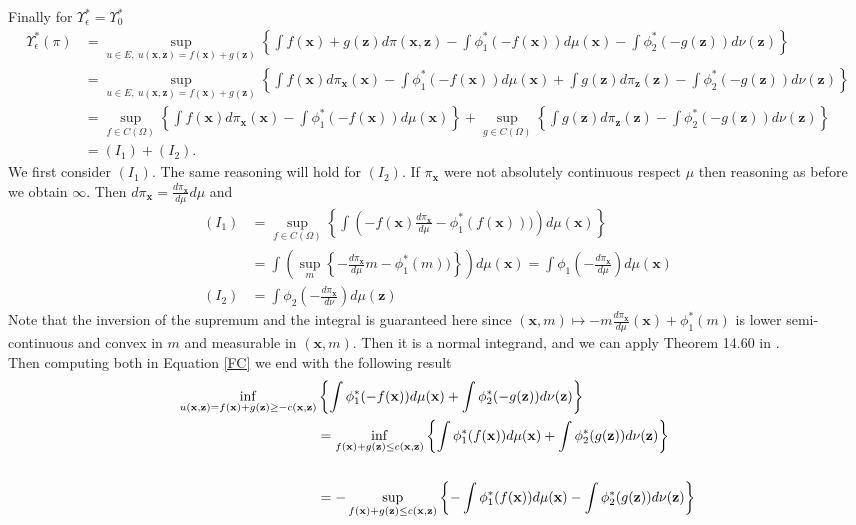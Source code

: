 Finally for $\Upsilon^*_{\epsilon}=\Upsilon^*_{0}$
\begin{align*}
\Upsilon^*_{\epsilon}(\pi)&=\sup_{u\in E,\  u(\textbf{x},{{\textbf{z}}})=f(\textbf{x})+g({{\textbf{z}}}) }\left\lbrace \int f(\textbf{x})+g({{\textbf{z}}}) d\pi(\textbf{x},{{\textbf{z}}})-\int \phi_1^*(-f(\textbf{x}))d\mu(\textbf{x}) -\int \phi_2^*(-g({{\textbf{z}}})) d\nu({{\textbf{z}}})\right\rbrace\\
 &=\sup_{u\in E,\  u(\textbf{x},{{\textbf{z}}})=f(\textbf{x})+g({{\textbf{z}}}) }\left\lbrace \int f(\textbf{x})d\pi_\textbf{x}(\textbf{x})-\int \phi_1^*(-f(\textbf{x}))d\mu(\textbf{x}) +\int g({{\textbf{z}}}) d\pi_{{\textbf{z}}}({{\textbf{z}}})-\int \phi_2^*(-g({{\textbf{z}}})) d\nu({{\textbf{z}}})\right\rbrace\\
  &=\sup_{f \in C(\Omega)}\left\lbrace \int f(\textbf{x})d\pi_\textbf{x}(\textbf{x})-\int \phi_1^*(-f(\textbf{x}))d\mu(\textbf{x})\right\rbrace +\sup_{g\in C(\Omega) }\left\lbrace \int g({{\textbf{z}}}) d\pi_{{\textbf{z}}}({{\textbf{z}}})-\int \phi_2^*(-g({{\textbf{z}}})) d\nu({{\textbf{z}}})\right\rbrace\\
  &=(I_1)+(I_2).
\end{align*}
We first consider  $(I_1)$. The same reasoning will hold for $(I_2)$. If $\pi_\textbf{x}$ were not absolutely continuous respect $\mu$ then reasoning as before we obtain $\infty$. Then $d \pi_\textbf{x}=\frac{d\pi_\textbf{x}}{d\mu}d\mu$ and
\begin{align*}
(I_1)&=\sup_{f \in C(\Omega)}\left\lbrace \int \left( -f(\textbf{x})\frac{d\pi_\textbf{x}}{d\mu}-\phi_1^*(f(\textbf{x})))\right)d\mu(\textbf{x})\right\rbrace\\
&=\int \left( \sup_{m}\left\lbrace -\frac{d\pi_\textbf{x}}{d\mu}m- \phi_1^*(m))\right\rbrace\right)d\mu(\textbf{x})=\int \phi_1(-\frac{d\pi_\textbf{x}}{d\mu})d\mu(\textbf{x})\\
(I_2)&=\int \phi_2(-\frac{d\pi_\textbf{x}}{d\nu})d\mu({{\textbf{z}}})
\end{align*}
Note that the inversion of the  supremum and  the integral  is guaranteed here since $(\textbf{x},m)\mapsto -m\frac{d\pi_\textbf{x}}{d\mu}(\textbf{x})+\phi_1^*(m)$ is lower semi-continuous and convex in $m$ and measurable in $(\textbf{x},m)$. Then it is a normal integrand, and we can apply Theorem 14.60 in \cite{RoWe}.\\
Then computing both in Equation \eqref{FC} we end with the following result
\begin{align*}
\inf_{ u(\textbf{x},{\textbf{{{\textbf{z}}}}})=f(\textbf{x})+g({\textbf{{{\textbf{z}}}}})\geq -c(\textbf{x},{{\textbf{z}}})}&\left\lbrace \int \phi_1^*(-f(\textbf{x}))d\mu(\textbf{x})+\int \phi_2^*(-g({{\textbf{z}}})) d\nu({{\textbf{z}}})\right\rbrace\\& = \inf_{ f(\textbf{x})+g({{\textbf{z}}})\leq c(\textbf{x},{{\textbf{z}}})}\left\lbrace \int\phi_1^*(f(\textbf{x}))d\mu(\textbf{x})+\int \phi_2^*(g({{\textbf{z}}})) d\nu({{\textbf{z}}})\right\rbrace\\
\\& = -\sup_{ f(\textbf{x})+g({{\textbf{z}}})\leq c(\textbf{x},{{\textbf{z}}})}\left\lbrace -\int \phi_1^*(f(\textbf{x}))d\mu(\textbf{x})-\int \phi_2^*(g({{\textbf{z}}})) d\nu({{\textbf{z}}})\right\rbrace
\end{align*}
